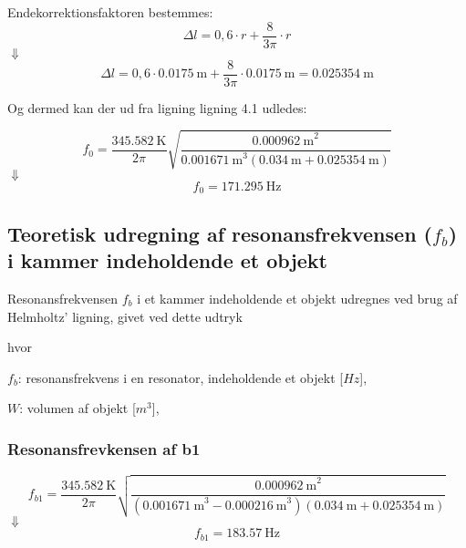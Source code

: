 Endekorrektionsfaktoren bestemmes: 
\begin{equation}
		\Delta l = 0,6 \cdot r + \frac{8}{3\pi} \cdot r 
\end{equation} 
$\Downarrow$
\begin{equation}
\Delta l = 0,6 \cdot {\SI{0,0175}{\meter}} + \frac{8}{3\pi} \cdot {\SI{0,0175}{\meter}} = {\SI{0.025354}{\meter}} 
\end{equation}
		
Og dermed kan der ud fra ligning ligning 4.1 udledes: 

\begin{equation}
		f_{0} = \frac{{\SI{345,582}{\kelvin}}}{2\pi}\sqrt{\frac{{\SI{0,000962}{\meter}^2}}{{\SI{0,001671}{\meter}^3}({\SI{0,034}{\meter}}+ {\SI{0.025354}{\meter}})}}
\end{equation}	
$\Downarrow$
\begin{equation}
		f_{0} = {\SI{171,295}{\hertz}}
		\end{equation}

\subsection{Teoretisk udregning af resonansfrekvensen ($f_{b}$) i kammer indeholdende et objekt}

Resonansfrekvensen $f_{b}$ i et kammer indeholdende et objekt udregnes ved brug af Helmholtz' ligning, givet ved dette udtryk \fb

hvor 
\begin{description}[align=left,labelindent=0.3cm]
\item $f_{b}$: resonansfrekvens i en resonator, indeholdende et objekt [$Hz$],\\
\item $W$: volumen af objekt [$m^3$],\\
\end{description}


\subsubsection{Resonansfrevkensen af b1} 
\begin{equation}
		f_{b1} = \frac{{\SI{345,582}{\kelvin}}}{2\pi}\sqrt{\frac{{\SI{0,000962}{\meter}^2}}{({\SI{0,001671}{\meter}^3}-{\SI{0,000216}{\meter}^3})({\SI{0,034}{\meter}}+ {\SI{0.025354}{\meter}})}}	
\end{equation}
$\Downarrow$
\begin{equation}
		f_{b1} = {\SI{183,57}{\hertz}}
\end{equation}


